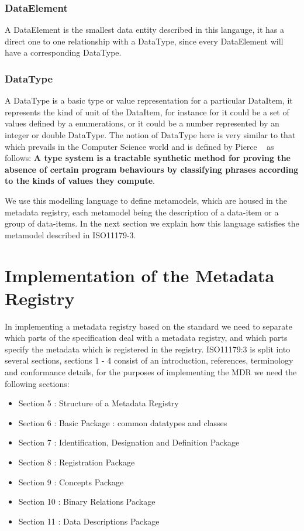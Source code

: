 \documentclass{llncs}
\begin{document}
 \subsubsection{DataElement}
 A DataElement is the smallest data entity described in this langauge, it has a direct one to one relationship with a DataType, since every DataElement will have a corresponding DataType. 
 
 \subsubsection{DataType}
 A DataType is a basic type or value representation for a particular DataItem, it represents the kind of unit of the DataItem, for instance for it could be a set of values defined by a enumerations, or it could be a number represented by an integer or double DataType. The notion of DataType here is very similar to that which prevails in the Computer Science world and is defined by Pierce ~\cite{Pierce} as follows:
\textbf{A type system is a tractable synthetic method for proving the absence of certain program behaviours by classifying phrases according to the kinds of values they compute}. 

We use this modelling language to define metamodels, which are housed in the metadata registry, each metamodel being the description of a data-item or a group of data-items. In the next section we explain how this language satisfies the metamodel described in ISO11179-3.



\section{Implementation of the Metadata Registry}

In implementing a metadata registry based on the standard we need to separate which parts of the specification deal with a metadata registry, and which parts specify the metadata which is registered in the registry. ISO11179:3 is split into several sections, sections 1 - 4 consist of an introduction, references, terminology and conformance details, for the purposes of implementing the MDR we need the following sections:
\begin{itemize}
\item Section 5 : Structure of a Metadata Registry
\item Section 6 : Basic Package : common datatypes and classes
\item Section 7 : Identification, Designation and Definition Package
\item Section 8 : Registration Package
\item Section 9 : Concepts Package
\item Section 10 : Binary Relations Package
\item Section 11 : Data Descriptions Package
\end{itemize}
\end{document}
